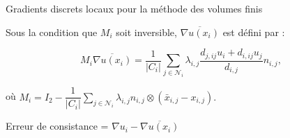 \documentclass[10pt]{beamer}
\newcommand*\abs[1]{\left\lvert #1 \right\rvert}
\begin{document}
	\begin{frame}{Gradients discrets locaux pour la méthode des volumes finis}
		
		Sous la condition que $M_i$ soit inversible, $\overline{\nabla u(x_i)}$ est défini par :
		
		\vspace{.2cm}
		
		\begin{equation}\label{eq:grad_discret}
			M_i \overline{ {\nabla u}(x_i)} = \dfrac1{\abs{C_i}}\sum_{j \in \mathcal N_i} \lambda_{i,j}\dfrac{d_{j,ij}u_i + d_{i,ij}u_j}{d_{i,j}} {n_{i,j}},
		\end{equation}\pause
		
		\vspace{.5cm}
		
		où $M_i = I_2 - \dfrac1{\abs{C_i}}\displaystyle\sum_{j \in \mathcal N_i} \lambda_{i,j} {n_{i,j}}\otimes\left( {\bar x_{i,j}-x_{i,j}}\right).$\pause
		
		\vspace{.5cm}
		
		\begin{center}
			Erreur de consistance = $\nabla u_i - \overline{\nabla u(x_i)}$
		\end{center}
	\end{frame}
	
\end{document}
